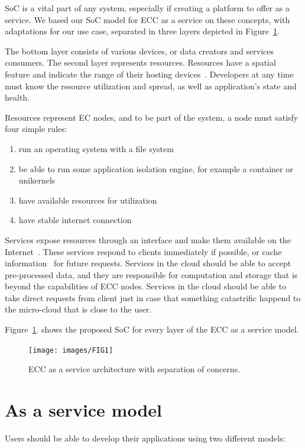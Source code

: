 SoC is a vital part of any system, especially if creating a platform to offer as a service. We based our SoC model for ECC as a service on these concepts, with adaptations for our use case, separated in three layers depicted in Figure~\ref{fig:fig10}. 

The bottom layer consists of various devices, or data creators and services consumers. The second layer represents resources. Resources have a spatial feature and indicate the range of their hosting devices~\cite{JinCJL14}. Developers at any time must know the resource utilization and spread, as well as application's state and health. 

Resources represent EC nodes, and to be part of the system, a node must satisfy four simple rules:

\begin{enumerate}[start=1,label={(\bfseries \arabic*)}]
\item run an operating system with a file system 
\item be able to run some application isolation engine, for example a container or unikernels 
\item have available resources for utilization 
\item have stable internet connection
\end{enumerate}

Services expose resources through an interface and make them available on the Internet~\cite{JinCJL14}. These services respond to clients immediately if possible, or cache information~\cite{SatyanarayananBCD09,YaoXWYZP20} for future requests. Services in the cloud should be able to accept pre-processed data, and they are responsible for computation and storage that is beyond the capabilities of ECC nodes. Services in the cloud should be able to take direct requests from client just in case that something catastrific happend to the micro-cloud that is close to the user.

Figure~\ref{fig:fig10}. shows the proposed SoC for every layer of the ECC as a service model.

\begin{figure}[H]
	\texttt{[image: images/FIG1]}
	\vspace{-0.7cm}
	\caption{ECC as a service architecture with separation of concerns.}
	\label{fig:fig10}
\end{figure}
%
%
\section{As a service model}\label{sec:as_a_service_model}
%
Users should be able to develop their applications using two different models:
 
